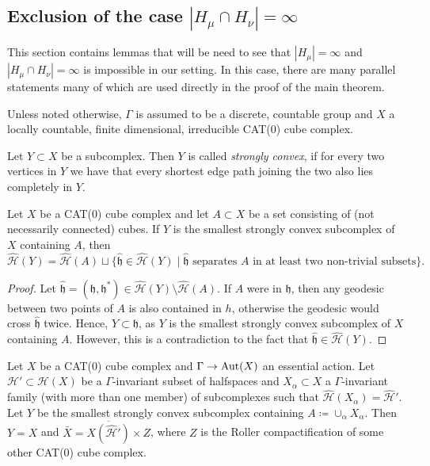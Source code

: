 \subsection{Exclusion of the case \(|H_\mu \cap H_\nu| = \infty\)}
\label{sec:M=infty}

This section contains lemmas that will be need to see that \(|H_\mu| = \infty\) and \(|H_\mu \cap H_\nu| = \infty\) is impossible in our setting. In this case, there are many parallel statements many of which are used directly in the proof of the main theorem.

Unless noted otherwise, \(\Gamma\) is assumed to be a discrete, countable group and \(X\) a locally countable, finite dimensional, irreducible CAT(0) cube complex.

\begin{defin}
  Let \(Y \subset X\) be a subcomplex. Then \(Y\) is called \emph{strongly convex}, if for every two vertices in \(Y\) we have that every shortest edge path joining the two also lies completely in \(Y\).
\end{defin}

\begin{lemma}[{\cite[Lemma~4.16]{MR3509968}}]
  \label{lem:4.16}
  Let \(X\) be a CAT(0) cube complex and let \(A \subset X\) be a set consisting of (not necessarily connected) cubes. If \(Y\) is the smallest strongly convex subcomplex of \(X\) containing \(A\), then
  \[
    \mathcal{\hat H}(Y) = \mathcal{\hat H}(A) \sqcup \{\mathfrak{\hat h} \in \mathcal{\hat H}(Y) \mid \mathfrak{\hat h} \text{ separates } A \text{ in at least two non-trivial subsets}\}.
  \]
\end{lemma}

\begin{proof}
  Let \(\mathfrak{\hat h} = (\mathfrak{h}, \mathfrak{h}^\ast) \in \mathcal{\hat H}(Y) \setminus \mathcal{\hat H}(A)\). If \(A\) were in \(\mathfrak{h}\), then any geodesic between two points of \(A\) is also contained in \(h\), otherwise the geodesic would cross \(\mathfrak{\hat h}\) twice. Hence, \(Y \subset \mathfrak{h}\), as \(Y\) is the smallest strongly convex subcomplex of \(X\) containing \(A\). However, this is a contradiction to the fact that \(\mathfrak{\hat h} \in \mathcal{\hat H}(Y)\).
\end{proof}

\begin{prop}[{\cite[Proposition~4.17]{MR3509968}}]
  \label{prop:4.17}
  Let \(X\) be a CAT(0) cube complex and \(\Gamma \to \operatorname{Aut}(X)\) an essential action. Let \(\mathcal{H}' \subset \mathcal{H}(X)\) be a \(\Gamma\)-invariant subset of halfspaces and \(X_\alpha \subset X\) a \(\Gamma\)-invariant family (with more than one member) of subcomplexes such that \(\mathcal{\hat H}(X_\alpha) = \mathcal{\hat H}'\). Let \(Y\) be the smallest strongly convex subcomplex containing \(A \coloneqq \cup_\alpha X_\alpha\). Then \(Y = X\) and \(\bar X = \overline{X(\mathcal{\hat H}')} \times Z\), where \(Z\) is the Roller compactification of some other CAT(0) cube complex.
\end{prop}

